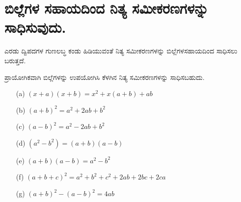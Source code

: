 \section{ಬಿಲ್ಲೆಗಳ ಸಹಾಯದಿಂದ ನಿತ್ಯ ಸಮೀಕರಣಗಳನ್ನು ಸಾಧಿಸುವುದು.}\label{sec3.7}%

ಎರಡು ದ್ವಿಪದಗಳ ಗುಣಲಬ್ಧ ಕಂಡು ಹಿಡಿಯುವಂತೆ ನಿತ್ಯ ಸಮೀಕರಣಗಳನ್ನು ಬಿಲ್ಲೆಗಳ\break ಸಹಾಯದಿಂದ ಸಾಧಿಸಲು ಬರುತ್ತದೆ.

ಪ್ರಾಯೋಗಿಕವಾಗಿ ಬಿಲ್ಲೆಗಳನ್ನು ಉಪಯೋಗಿಸಿ ಕೆಳಗಿನ ನಿತ್ಯ ಸಮೀಕರಣಗಳನ್ನು ಸಾಧಿಸಬಹುದು. 
\begin{itemize}
\item [(a)] $(x+a)(x+b) = x^2 + x(a+b) + ab$
\item [(b)] $(a+b)^2 = a^2 + 2ab + b^2$
\item [(c)] $(a - b)^2 = a^2 - 2ab + b^2$
\item [(d)] $(a^2 - b^2) = (a+b)(a-b)$
\item [(e)] $(a+b)(a-b) = a^2 - b^2$
\item [(f)] $(a + b + c)^2 = a^2 + b^2 + c^2 + 2ab + 2bc + 2ca$
\item [(g)] $(a + b)^2 - (a - b)^2 = 4ab$
\end{itemize}
~
